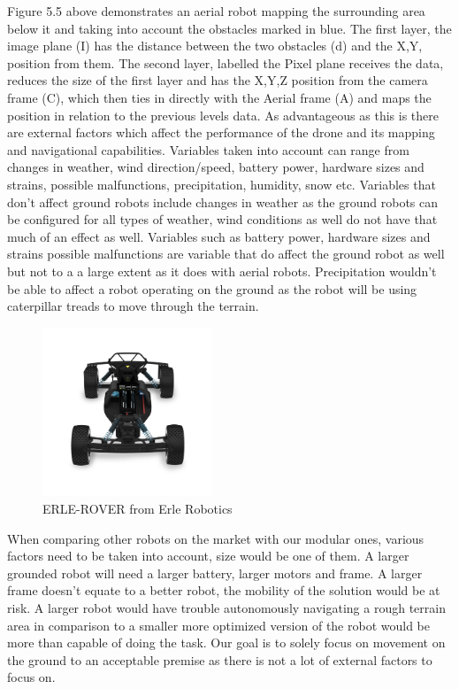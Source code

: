\documentclass[12pt]{report}
\begin{document}
\vspace{1em}
Figure 5.5 above demonstrates an aerial robot mapping the surrounding area below it and taking into account the obstacles marked in blue. The first layer, the image plane (I) has the distance between the two obstacles (d) and the X,Y,  position from them. The second layer, labelled the Pixel plane receives the data, reduces the size of the first layer and has the X,Y,Z position from the camera frame (C), which then ties in directly with the Aerial frame (A) and maps the position in relation to the previous levels data. As advantageous as this is there are external factors which affect the performance of the drone and its mapping and navigational capabilities. Variables taken into account can range from changes in weather, wind direction/speed, battery power, hardware sizes and strains, possible malfunctions, precipitation, humidity, snow etc. Variables that don’t affect ground robots include changes in weather as the ground robots can be configured for all types of weather, wind conditions as well do not have that much of an effect as well. Variables such as battery power, hardware sizes and strains possible malfunctions are variable that do affect the ground robot as well but not to a a large extent as it does with aerial robots. Precipitation wouldn’t be able to affect a robot operating on the ground as the robot will be using caterpillar treads to move through the terrain.\par
\begin{figure}[H]
        \centering
        \includegraphics[width=0.45\textwidth]{Fig14.png}
        \caption{ERLE-ROVER from Erle Robotics}
        \label{fig:14}
\end{figure}
\vspace{1em}
When comparing other robots on the market with our modular ones, various factors need to be taken into account, size would be one of them. A larger grounded robot will need a larger battery, larger motors and frame. A larger frame doesn’t equate to a better robot, the mobility of the solution would be at risk. A larger robot would have trouble autonomously navigating a rough terrain area in comparison to a smaller more optimized version of the robot would be more than capable of doing the task. Our goal is to solely focus on movement on the ground to an acceptable premise as there is not a lot of external factors to focus on.\par
\end{document}
